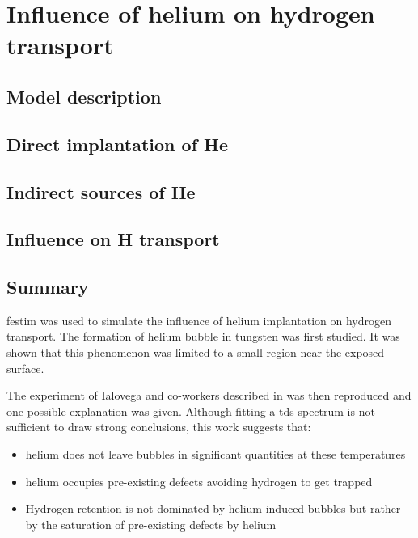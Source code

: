 \setchapterpreamble[u]{\margintoc}
\chapter{Influence of helium on hydrogen transport}
\label{Chapter5} %


\section{Model description}

\section{Direct implantation of He}

\section{Indirect sources of He}

\section{Influence on H transport}


\section{Summary}

\gls{festim} was used to simulate the influence of helium implantation on hydrogen transport.
The formation of helium bubble in tungsten was first studied.
It was shown that this phenomenon was limited to a small region near the exposed surface.

The experiment of Ialovega and co-workers described in  was then reproduced and one possible explanation was given.
Although fitting a \gls{tds} spectrum is not sufficient to draw strong conclusions, this work suggests that:
\begin{itemize}
    \item helium does not leave bubbles in significant quantities at these temperatures
    \item helium occupies pre-existing defects avoiding hydrogen to get trapped
    \item Hydrogen retention is not dominated by helium-induced bubbles but rather by the saturation of pre-existing defects by helium
\end{itemize}

